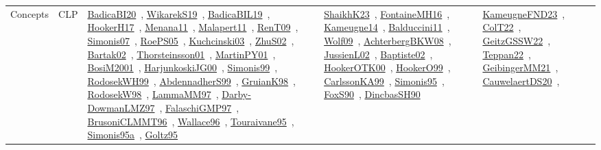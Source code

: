 {\begin{longtable}{lp{3cm}>{\raggedright\arraybackslash}p{6cm}>{\raggedright\arraybackslash}p{6cm}>{\raggedright\arraybackslash}p{8cm}}
\index{CLP}\index{Concepts!CLP}Concepts & CLP & \href{../works/BadicaBI20.pdf}{BadicaBI20}~\cite{BadicaBI20}, \href{../works/WikarekS19.pdf}{WikarekS19}~\cite{WikarekS19}, \href{../works/BadicaBIL19.pdf}{BadicaBIL19}~\cite{BadicaBIL19}, \href{../works/HookerH17.pdf}{HookerH17}~\cite{HookerH17}, \href{../works/Menana11.pdf}{Menana11}~\cite{Menana11}, \href{../works/Malapert11.pdf}{Malapert11}~\cite{Malapert11}, \href{../works/RenT09.pdf}{RenT09}~\cite{RenT09}, \href{../works/Simonis07.pdf}{Simonis07}~\cite{Simonis07}, \href{../works/RoePS05.pdf}{RoePS05}~\cite{RoePS05}, \href{../works/Kuchcinski03.pdf}{Kuchcinski03}~\cite{Kuchcinski03}, \href{../works/ZhuS02.pdf}{ZhuS02}~\cite{ZhuS02}, \href{../works/Bartak02.pdf}{Bartak02}~\cite{Bartak02}, \href{../works/Thorsteinsson01.pdf}{Thorsteinsson01}~\cite{Thorsteinsson01}, \href{../works/MartinPY01.pdf}{MartinPY01}~\cite{MartinPY01}, \href{../works/BosiM2001.pdf}{BosiM2001}~\cite{BosiM2001}, \href{../works/HarjunkoskiJG00.pdf}{HarjunkoskiJG00}~\cite{HarjunkoskiJG00}, \href{../works/Simonis99.pdf}{Simonis99}~\cite{Simonis99}, \href{../works/RodosekWH99.pdf}{RodosekWH99}~\cite{RodosekWH99}, \href{../works/AbdennadherS99.pdf}{AbdennadherS99}~\cite{AbdennadherS99}, \href{../works/GruianK98.pdf}{GruianK98}~\cite{GruianK98}, \href{../works/RodosekW98.pdf}{RodosekW98}~\cite{RodosekW98}, \href{../works/LammaMM97.pdf}{LammaMM97}~\cite{LammaMM97}, \href{../works/Darby-DowmanLMZ97.pdf}{Darby-DowmanLMZ97}~\cite{Darby-DowmanLMZ97}, \href{../works/FalaschiGMP97.pdf}{FalaschiGMP97}~\cite{FalaschiGMP97}, \href{../works/BrusoniCLMMT96.pdf}{BrusoniCLMMT96}~\cite{BrusoniCLMMT96}, \href{../works/Wallace96.pdf}{Wallace96}~\cite{Wallace96}, \href{../works/Touraivane95.pdf}{Touraivane95}~\cite{Touraivane95}, \href{../works/Simonis95a.pdf}{Simonis95a}~\cite{Simonis95a}, \href{../works/Goltz95.pdf}{Goltz95}~\cite{Goltz95} & \href{../works/ShaikhK23.pdf}{ShaikhK23}~\cite{ShaikhK23}, \href{../works/FontaineMH16.pdf}{FontaineMH16}~\cite{FontaineMH16}, \href{../works/Kameugne14.pdf}{Kameugne14}~\cite{Kameugne14}, \href{../works/Balduccini11.pdf}{Balduccini11}~\cite{Balduccini11}, \href{../works/Wolf09.pdf}{Wolf09}~\cite{Wolf09}, \href{../works/AchterbergBKW08.pdf}{AchterbergBKW08}~\cite{AchterbergBKW08}, \href{../works/JussienL02.pdf}{JussienL02}~\cite{JussienL02}, \href{../works/Baptiste02.pdf}{Baptiste02}~\cite{Baptiste02}, \href{../works/HookerOTK00.pdf}{HookerOTK00}~\cite{HookerOTK00}, \href{../works/HookerO99.pdf}{HookerO99}~\cite{HookerO99}, \href{../works/CarlssonKA99.pdf}{CarlssonKA99}~\cite{CarlssonKA99}, \href{../works/Simonis95.pdf}{Simonis95}~\cite{Simonis95}, \href{../works/FoxS90.pdf}{FoxS90}~\cite{FoxS90}, \href{../works/DincbasSH90.pdf}{DincbasSH90}~\cite{DincbasSH90} & \href{../works/KameugneFND23.pdf}{KameugneFND23}~\cite{KameugneFND23}, \href{../works/ColT22.pdf}{ColT22}~\cite{ColT22}, \href{../works/GeitzGSSW22.pdf}{GeitzGSSW22}~\cite{GeitzGSSW22}, \href{../works/Teppan22.pdf}{Teppan22}~\cite{Teppan22}, \href{../works/GeibingerMM21.pdf}{GeibingerMM21}~\cite{GeibingerMM21}, \href{../works/CauwelaertDS20.pdf}{CauwelaertDS20}~\cite{CauwelaertDS20}, 
\end{longtable}}
